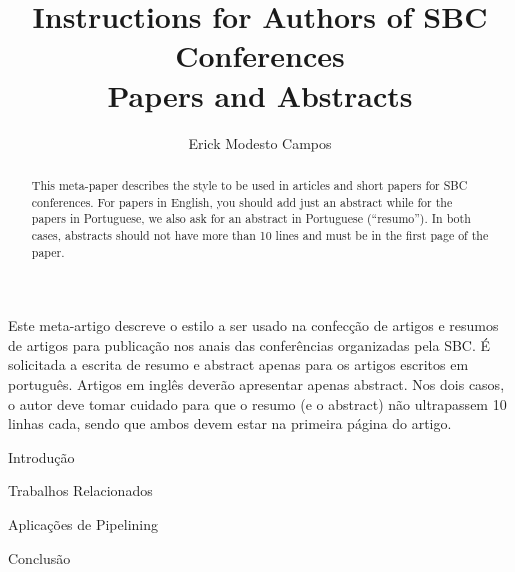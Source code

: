 \documentclass[12pt]{article}
\title{Instructions for Authors of SBC Conferences\\ Papers and Abstracts}
\author{Erick Modesto Campos}
\begin{document}
 

\onehalfspace
\maketitle

\begin{abstract}
  This meta-paper describes the style to be used in articles and short papers
  for SBC conferences. For papers in English, you should add just an abstract
  while for the papers in Portuguese, we also ask for an abstract in
  Portuguese (``resumo''). In both cases, abstracts should not have more than
  10 lines and must be in the first page of the paper.
\end{abstract}
     
\begin{resumo} 
  Este meta-artigo descreve o estilo a ser usado na confecção de artigos e
  resumos de artigos para publicação nos anais das conferências organizadas
  pela SBC. É solicitada a escrita de resumo e abstract apenas para os artigos
  escritos em português. Artigos em inglês deverão apresentar apenas abstract.
  Nos dois casos, o autor deve tomar cuidado para que o resumo (e o abstract)
  não ultrapassem 10 linhas cada, sendo que ambos devem estar na primeira
  página do artigo.
\end{resumo}

\begin{section}{Introdução}

\end{section}
\begin{section}{Trabalhos Relacionados}

\end{section}
\begin{section}{Aplicações de Pipelining}

\end{section}
\begin{section}{Conclusão}

\end{section}



\end{document}
